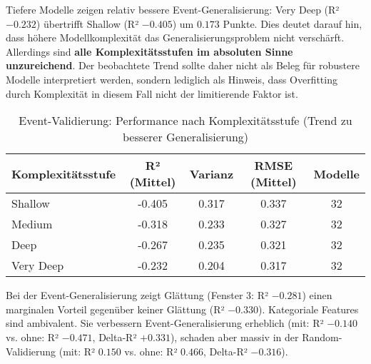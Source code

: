 Tiefere Modelle zeigen relativ bessere Event-Generalisierung: Very Deep (R² $-0.232$) übertrifft Shallow (R² $-0.405$) um $0.173$ Punkte. Dies deutet darauf hin, dass höhere Modellkomplexität das Generalisierungsproblem nicht verschärft. Allerdings sind \textbf{alle Komplexitätsstufen im absoluten Sinne unzureichend}. Der beobachtete Trend sollte daher nicht als Beleg für robustere Modelle interpretiert werden, sondern lediglich als Hinweis, dass Overfitting durch Komplexität in diesem Fall nicht der limitierende Faktor ist.

\begin{table}[H]
  \centering
  \begin{tabular}{lcccc}
    \toprule
    \textbf{Komplexitätsstufe} & \textbf{R² (Mittel)} & \textbf{Varianz} & \textbf{RMSE (Mittel)} & \textbf{Modelle} \\
    \midrule
    Shallow & -0.405 & 0.317 & 0.337 & 32 \\
    Medium & -0.318 & 0.233 & 0.327 & 32 \\
    Deep & -0.267 & 0.235 & 0.321 & 32 \\
    Very Deep & -0.232 & 0.204 & 0.317 & 32 \\
    \bottomrule
  \end{tabular}
  \caption{Event-Validierung: Performance nach Komplexitätsstufe (Trend zu besserer Generalisierung)}
  \label{tab:complexity_event}
\end{table}


Bei der Event-Generalisierung zeigt Glättung (Fenster 3: R² $-0.281$) einen marginalen Vorteil gegenüber keiner Glättung (R² $-0.330$). Kategoriale Features sind ambivalent. Sie verbessern Event-Generalisierung erheblich (mit: R² $-0.140$ vs. ohne: R² $-0.471$, Delta-R² $+0.331$), schaden aber massiv in der Random-Validierung (mit: R² $0.150$ vs. ohne: R² $0.466$, Delta-R² $-0.316$).


